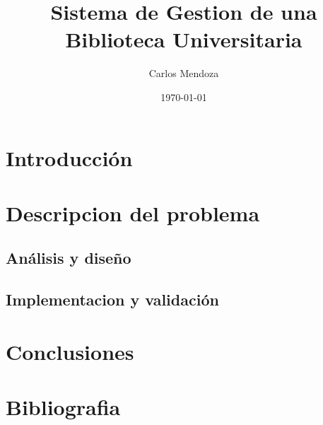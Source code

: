 \documentclass[letterpaper,12pt]{article}
\title{Sistema de Gestion de una Biblioteca Universitaria}
\author{Carlos Mendoza}
\date{\today}
\begin{document}
\maketitle
\tableofcontents
\lstlistoflistings

\section{Introducción}
\section{Descripcion del problema}
\subsection{Análisis y diseño}

\subsection{Implementacion y validación}



\section{Conclusiones}



\section{Bibliografia}
\end{document}
